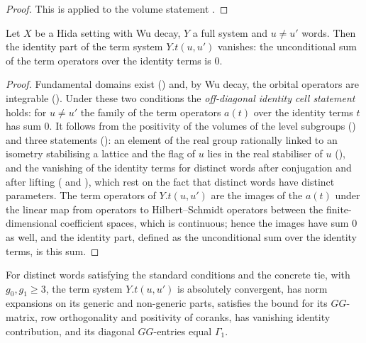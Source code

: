 \begin{proof}
This is  applied to the volume statement
.
\end{proof}

\begin{proposition}\label{pf:thmS-leaves:prop:idzero}
Let $X$ be a Hida setting with Wu decay, $Y$ a full system and $u\ne u'$ words. Then the identity part of the term system $Y.t(u,u')$
vanishes: the unconditional sum of the term operators over the identity terms is $0$.
\end{proposition}

\begin{proof}
Fundamental domains exist () and, by Wu decay, the orbital operators are integrable
(). Under these two conditions the \emph{off-diagonal identity cell statement}
holds: for $u\ne u'$ the family of the term operators $a(t)$ over the identity terms $t$ has sum $0$. It follows from the positivity of the
volumes of the level subgroups () and three statements
(): an element of the real group rationally linked to an isometry stabilising a lattice
and the flag of $u$ lies in the real stabiliser of $u$ (), and the vanishing of the identity
terms for distinct words after conjugation and after lifting ( and ),
which rest on the fact that distinct words have distinct parameters. The term operators of $Y.t(u,u')$ are the images of the $a(t)$
under the linear map from operators to Hilbert--Schmidt operators between the finite-dimensional coefficient spaces, which is
continuous; hence the images have sum $0$ as well, and the identity part, defined as the unconditional sum over the identity terms, is
this sum.
\end{proof}
\begin{proposition}\label{pf:thmS-leaves:prop:split}
For distinct words satisfying the standard conditions and the concrete tie, with $g_0,g_1\ge3$, the term system $Y.t(u,u')$ is
absolutely convergent, has norm expansions on its generic and non-generic parts, satisfies the bound for its $GG$-matrix, row
orthogonality and positivity of coranks, has vanishing identity contribution, and its diagonal $GG$-entries equal $\Gamma_1$.
\end{proposition}

